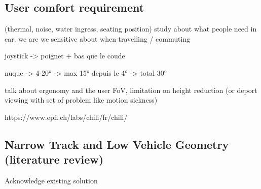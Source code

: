 \subsection{User comfort requirement}
(thermal, noise, water ingress, seating position)
study about what people need in car. we are we sensitive about when travelling / commuting


joystick -> poignet + bas que le coude

nuque -> 4-20°  -> max 15° depuis le 4° ->  total 30°

talk about ergonomy and the user FoV, limitation on height reduction (or deport viewing with set of problem like motion sickness)

https://www.epfl.ch/labs/chili/fr/chili/

\subsection{Narrow Track and Low Vehicle Geometry (literature review)}
Acknowledge existing solution
